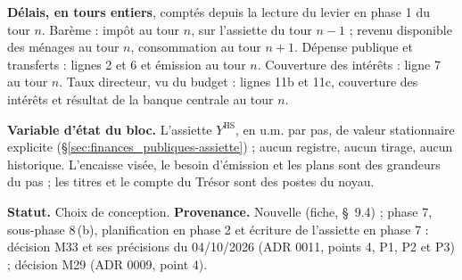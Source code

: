 \documentclass[11pt,a4paper]{article}
\begin{document}
\begin{proposee}
\textbf{Délais, en tours entiers}, comptés depuis la lecture du levier en phase 1 du tour $n$. Barème : impôt au tour $n$, sur l'assiette du tour $n - 1$ ; revenu disponible des ménages au tour $n$, consommation au tour $n + 1$. Dépense publique et transferts : lignes 2 et 6 et émission au tour $n$. Couverture des intérêts : ligne 7 au tour $n$. Taux directeur, vu du budget : lignes 11b et 11c, couverture des intérêts et résultat de la banque centrale au tour $n$.

\textbf{Variable d'état du bloc.} L'assiette $Y^{\mathrm{HS}}$, en u.m. par pas, de valeur stationnaire explicite (\S\ref{sec:finances_publiques-assiette}) ; aucun registre, aucun tirage, aucun historique. L'encaisse visée, le besoin d'émission et les plans sont des grandeurs du pas ; les titres et le compte du Trésor sont des postes du noyau.

\textbf{Statut.} Choix de conception. \textbf{Provenance.} Nouvelle (fiche, \S~9.4) ; phase 7, sous-phase 8\,(b), planification en phase 2 et écriture de l'assiette en phase 7 : décision M33 et ses précisions du 04/10/2026 (ADR 0011, points 4, P1, P2 et P3) ; décision M29 (ADR 0009, point 4).
\end{proposee}
\end{document}
